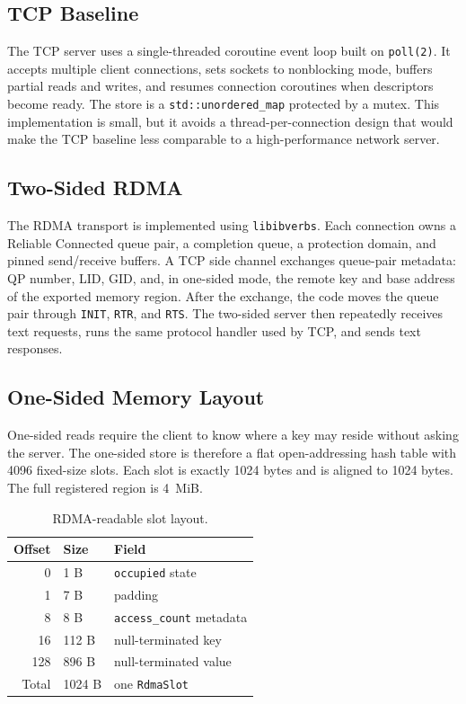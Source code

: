 \documentclass[letterpaper,twocolumn,10pt]{article}
\begin{document}
\subsection{TCP Baseline}

The TCP server uses a single-threaded coroutine event loop built on
\texttt{poll(2)}.  It accepts multiple client connections, sets sockets to
nonblocking mode, buffers partial reads and writes, and resumes connection
coroutines when descriptors become ready.  The store is a
\texttt{std::unordered\_map} protected by a mutex.  This implementation is
small, but it avoids a thread-per-connection design that would make the TCP
baseline less comparable to a high-performance network server.

\subsection{Two-Sided RDMA}

The RDMA transport is implemented using \texttt{libibverbs}.  Each connection
owns a Reliable Connected queue pair, a completion queue, a protection domain,
and pinned send/receive buffers.  A TCP side channel exchanges queue-pair
metadata: QP number, LID, GID, and, in one-sided mode, the remote key and base
address of the exported memory region.  After the exchange, the code moves the
queue pair through \texttt{INIT}, \texttt{RTR}, and \texttt{RTS}.  The
two-sided server then repeatedly receives text requests, runs the same protocol
handler used by TCP, and sends text responses.

\subsection{One-Sided Memory Layout}

One-sided reads require the client to know where a key may reside without
asking the server.  The one-sided store is therefore a flat open-addressing
hash table with 4096 fixed-size slots.  Each slot is exactly 1024 bytes and is
aligned to 1024 bytes.  The full registered region is 4~MiB.

\begin{table}[h!]
\centering
\caption{RDMA-readable slot layout.}
\label{tab:slot-layout}
\begin{tabular}{rll}
\toprule
Offset & Size & Field \\
\midrule
0   & 1 B   & \texttt{occupied} state \\
1   & 7 B   & padding \\
8   & 8 B   & \texttt{access\_count} metadata \\
16  & 112 B & null-terminated key \\
128 & 896 B & null-terminated value \\
\midrule
Total & 1024 B & one \texttt{RdmaSlot} \\
\bottomrule
\end{tabular}
\end{table}
\end{document}
